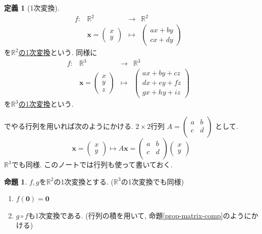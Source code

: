 \documentclass[dvipdfmx,a4paper,11pt]{article} %
\newcommand{\R}{\mathbb{R}}
\theoremstyle{definition}
\newtheorem{prop}[thm]{命題}
\newtheorem{dfn}[thm]{定義}
\begin{document}
   \begin{dfn}[1次変換]
    \label{dfn-plane-linear}
$$
\begin{array}{ccccc}
f: &\R^2& \rightarrow & \R^2& \\
&
\bm{x}
=
\begin{pmatrix}
x \\ y
 \end{pmatrix} & \longmapsto & 
 \begin{pmatrix}
a x + by \\ c x +dy
 \end{pmatrix}
 &
\end{array}
$$
を\underline{$\R^2$の1次変換}という.
同様に
$$
\begin{array}{ccccc}
f: &\R^3& \rightarrow & \R^3& \\
&
\bm{x}
=
\begin{pmatrix}
x \\ y \\z
 \end{pmatrix} & \longmapsto & 
 \begin{pmatrix}
a x + by + cz \\ dx+ey+fz \\ gx + hy+iz 
 \end{pmatrix}
 &
\end{array}
$$
を\underline{$\R^3$の1次変換}という.

\end{dfn}

 \cite[2章]{O}でやる行列を用いれば次のようにかける. 
   $2 \times 2$行列
$
A=\begin{pmatrix}
a & b\\
c & d \\
\end{pmatrix}
$
として. 
$$
\bm{x}
=
\begin{pmatrix}
x \\ y
 \end{pmatrix} 
 \longmapsto  
  A \bm{x}
  = 
 \begin{pmatrix}
a &  b\\ c & d \\
 \end{pmatrix}
 \begin{pmatrix}
x \\ y
 \end{pmatrix} 
$$
$\R^3$でも同様. このノートでは行列も使って書いておく. 


\begin{prop}
$f, g$を$\R^2$の1次変換とする. ($\R^3$の1次変換でも同様)
\begin{enumerate}
\item \cite[命題 1.2.1]{O} $f (\bm{0})=\bm{0}$
\item  \cite[命題 1.2.2]{O}  $g \circ f$も1次変換である. (行列の積を用いて, 命題\ref{prop-matrix-comp}のようにかける)
\end{enumerate}
\end{prop}
\end{document}
